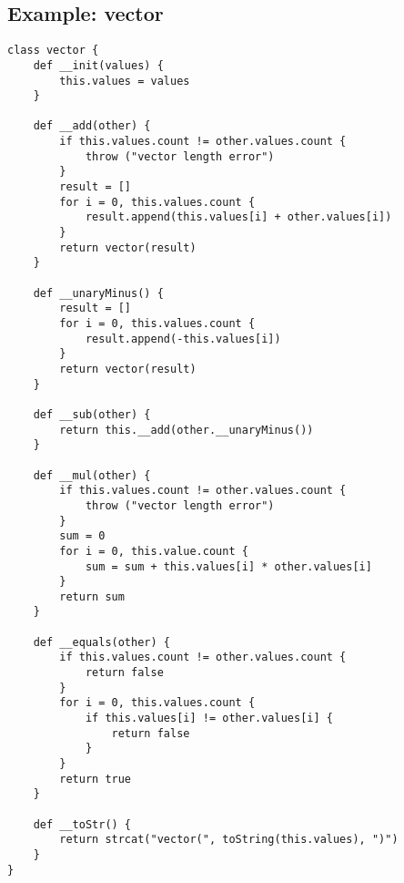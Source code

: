 \subsection{Example: vector}
\begin{lstlisting}
class vector {
	def __init(values) {
		this.values = values
	}

	def __add(other) {
		if this.values.count != other.values.count {
			throw ("vector length error")
		}
		result = [] 
		for i = 0, this.values.count {
			result.append(this.values[i] + other.values[i])
		}
		return vector(result)
	}

	def __unaryMinus() {
		result = [] 
		for i = 0, this.values.count {
			result.append(-this.values[i])
		}
		return vector(result)
	}

	def __sub(other) {
		return this.__add(other.__unaryMinus())
	}

	def __mul(other) {
		if this.values.count != other.values.count {
			throw ("vector length error")
		}
		sum = 0
		for i = 0, this.value.count {
			sum = sum + this.values[i] * other.values[i]
		}
		return sum
	}

	def __equals(other) {
		if this.values.count != other.values.count {
			return false
		}
		for i = 0, this.values.count {
			if this.values[i] != other.values[i] {
				return false
			}
		}
		return true
	}
		
	def __toStr() {
		return strcat("vector(", toString(this.values), ")")
	}
}
\end{lstlisting}
